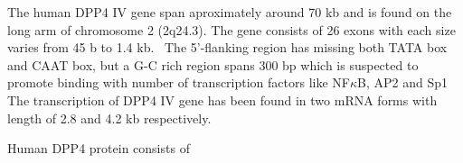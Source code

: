 The human DPP4 IV gene span aproximately around 70 kb and is found on the long arm of chromosome 2 (2q24.3). The gene consists of 26 exons with each size varies from 45 b to 1.4 kb.~\cite{Abbott1994} The 5'-flanking region has missing both TATA box and CAAT box, but a G-C rich region spans 300 bp which is suspected to promote binding with number of transcription factors like NF$\kappa$B, AP2 and Sp1~\cite{Abbott1994,Böhm1995} The transcription of DPP4 IV gene has been found in two mRNA forms with length of 2.8 and 4.2 kb respectively. 
\par
Human DPP4 protein consists of 